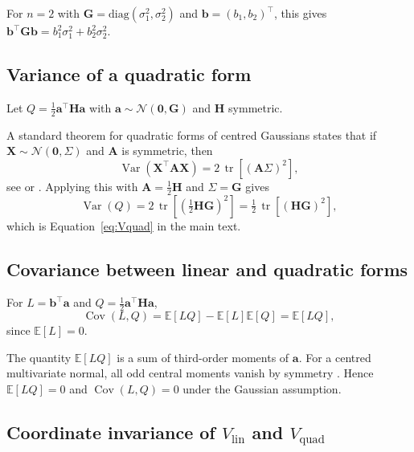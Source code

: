 \documentclass[9pt,twocolumn,twoside,lineno]{gsajnl}
\newcommand{\vect}[1]{\boldsymbol{#1}}
\newcommand{\mat}[1]{\mathbf{#1}}
\newcommand{\E}{\ensuremath{\mathbb{E}}\xspace}
\newcommand{\tr}{\ensuremath{\operatorname{tr}}\xspace}
\newcommand{\Vlin}{\ensuremath{V_{\text{lin}}}\xspace}
\newcommand{\Vquad}{\ensuremath{V_{\text{quad}}}\xspace}
\newcommand{\Var}{\ensuremath{\operatorname{Var}}\xspace}
\newcommand{\Cov}{\ensuremath{\operatorname{Cov}}\xspace}
\begin{document}
For $n=2$ with $\mat{G} = \text{diag}(\sigma_1^2, \sigma_2^2)$ and $\vect{b} = (b_1, b_2)^\top$, this gives $\vect{b}^\top \mat{G} \vect{b} = b_1^2 \sigma_1^2 + b_2^2 \sigma_2^2$.

\subsection{Variance of a quadratic form}

Let $Q = \tfrac{1}{2}\vect{a}^\top \mat{H} \vect{a}$ with $\vect{a} \sim \mathcal{N}(\vect{0}, \mat{G})$ and $\mat{H}$ symmetric.

A standard theorem for quadratic forms of centred Gaussians states that if $\vect{X} \sim \mathcal{N}(\vect{0},\Sigma)$ and $\mat{A}$ is symmetric, then
\begin{equation}
\Var(\vect{X}^\top \mat{A} \vect{X}) = 2\,\tr[(\mat{A}\Sigma)^2],
\end{equation}
see \citet{MagnusNeudecker1988} or \citet{Mardia1979}. Applying this with $\mat{A} = \tfrac{1}{2}\mat{H}$ and $\Sigma = \mat{G}$ gives
\begin{equation}
\Var(Q) = 2\,\tr\left[\left(\tfrac{1}{2}\mat{H}\mat{G}\right)^2\right] = \tfrac{1}{2}\,\tr[(\mat{H}\mat{G})^2],
\end{equation}
which is Equation~\eqref{eq:Vquad} in the main text.

\subsection{Covariance between linear and quadratic forms}

For $L = \vect{b}^\top\vect{a}$ and $Q = \tfrac{1}{2}\vect{a}^\top\mat{H}\vect{a}$,
\[
\Cov(L, Q) = \E[LQ] - \E[L]\E[Q] = \E[LQ],
\]
since $\E[L]=0$.

The quantity $\E[LQ]$ is a sum of third-order moments of $\vect{a}$. For a centred multivariate normal, all odd central moments vanish by symmetry \citep{Mardia1979}. Hence $\E[LQ] = 0$ and $\Cov(L, Q) = 0$ under the Gaussian assumption.

\subsection{Coordinate invariance of $\Vlin$ and $\Vquad$}
\end{document}
